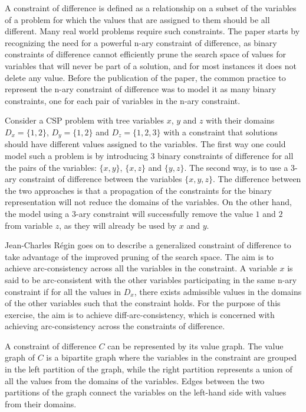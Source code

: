 \documentclass{l4proj}
\begin{document}
\noindent A constraint of difference is defined as a relationship on a subset of the variables of a problem for which the values that are assigned to them should be all different. Many real world problems require such constraints. The paper starts by recognizing the need for a powerful n-ary constraint of difference, as binary constraints of difference cannot efficiently prune the search space of values for variables that will never be part of a solution, and for most instances it does not delete any value. Before the publication of the paper, the common practice to represent the n-ary constraint of difference was to model it as many binary constraints, one for each pair of variables in the n-ary constraint.

\noindent Consider a CSP problem with tree variables $x$, $y$ and $z$ with their domains $D_x = \{1, 2\}$, $D_y = \{1, 2\}$ and $D_z = \{1, 2, 3\}$ with a constraint that solutions should have different values assigned to the variables. The first way one could model such a problem is by introducing 3 binary constraints of difference for all the pairs of the variables: $\{x, y\}$, $\{x, z\}$ and $\{y, z\}$. The second way, is to use a 3-ary constraint of difference between the variables $\{x, y, z\}$. The difference between the two approaches is that a propagation of the constraints for the binary representation will not reduce the domains of the variables. On the other hand, the model using a 3-ary constraint will successfully remove the value $1$ and $2$ from variable $z$, as they will already be used by $x$ and $y$.

\noindent Jean-Charles R\'egin \cite{regin1994filtering} goes on to describe a generalized constraint of difference to take advantage of the improved pruning of the search space. The aim is to achieve arc-consistency across all the variables in the constraint. A variable $x$ is said to be arc-consistent with the other variables participating in the same n-ary constraint if for all the values in $D_x$, there exists admissible values in the domains of the other variables such that the constraint holds. For the purpose of this exercise, the aim is to achieve diff-arc-consistency, which is concerned with achieving arc-consistency across the constraints of difference.

\noindent A constraint of difference $C$ can be represented by its value graph. The value graph of $C$ is a bipartite graph where the variables in the constraint are grouped in the left partition of the graph, while the right partition represents a union of all the values from the domains of the variables. Edges between the two partitions of the graph connect the variables on the left-hand side with values from their domains.
\end{document}
